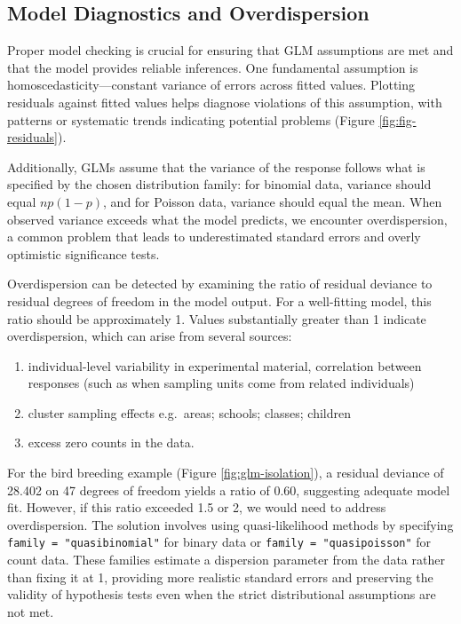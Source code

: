 \documentclass[
]{book}
\providecommand{\tightlist}{%
  \setlength{\itemsep}{0pt}\setlength{\parskip}{0pt}}
\begin{document}
\subsection{Model Diagnostics and Overdispersion}\label{model-diagnostics-and-overdispersion}

Proper model checking is crucial for ensuring that GLM assumptions are met and that the model provides reliable inferences. One fundamental assumption is homoscedasticity---constant variance of errors across fitted values. Plotting residuals against fitted values helps diagnose violations of this assumption, with patterns or systematic trends indicating potential problems (Figure \ref{fig:fig-residuals}).

Additionally, GLMs assume that the variance of the response follows what is specified by the chosen distribution family: for binomial data, variance should equal \(np(1-p)\), and for Poisson data, variance should equal the mean. When observed variance exceeds what the model predicts, we encounter overdispersion, a common problem that leads to underestimated standard errors and overly optimistic significance tests.

Overdispersion can be detected by examining the ratio of residual deviance to residual degrees of freedom in the model output. For a well-fitting model, this ratio should be approximately 1. Values substantially greater than 1 indicate overdispersion, which can arise from several sources:

\begin{enumerate}
\def\labelenumi{\arabic{enumi}.}
\tightlist
\item
  individual-level variability in experimental material, correlation between responses (such as when sampling units come from related individuals)
\item
  cluster sampling effects e.g.~areas; schools; classes; children
\item
  excess zero counts in the data.
\end{enumerate}

For the bird breeding example (Figure \ref{fig:glm-isolation}), a residual deviance of 28.402 on 47 degrees of freedom yields a ratio of 0.60, suggesting adequate model fit. However, if this ratio exceeded 1.5 or 2, we would need to address overdispersion. The solution involves using quasi-likelihood methods by specifying \texttt{family\ =\ "quasibinomial"} for binary data or \texttt{family\ =\ "quasipoisson"} for count data. These families estimate a dispersion parameter from the data rather than fixing it at 1, providing more realistic standard errors and preserving the validity of hypothesis tests even when the strict distributional assumptions are not met.
\end{document}
